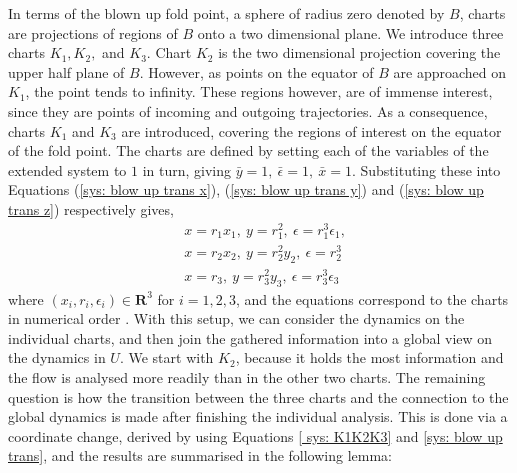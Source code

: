 In terms of the blown up fold point, a sphere of radius zero denoted by $B$, charts are projections of regions of $B$ onto a two dimensional plane. We introduce three charts $ K_1,K_2,$ and $K_3 $. Chart $K_2$ is the two dimensional projection covering the upper half plane of $B$. However, as points on the equator of $B$ are approached on $K_1$, the point tends to infinity. These regions however, are of immense interest, since they are points of incoming and outgoing trajectories. As a consequence, charts $K_1$ and $K_3$ are introduced, covering the regions of interest on the equator of the fold point. 
The charts are defined by setting each of the variables of the extended system to $1$ in turn, giving $ \bar{y}=1, \ \bar{\epsilon}=1, \ \bar{x}=1 $. Substituting these into Equations (\ref{sys: blow up trans x}), (\ref{sys: blow up trans y}) and (\ref{sys: blow up trans z}) respectively gives, 
\begin{subequations} \label{ sys: K1K2K3}
	\begin{align}
	&x=r_1x_1, \ y=r_1^2, \ \epsilon=r_1^3\epsilon_1, \label{sys: K1}\\
	&x=r_2x_2, \ y=r_2^2y_2, \ \epsilon=r_2^3 \label{sys: K2}\\
	&x=r_3, \ y=r_3^2y_3, \ \epsilon=r_3^3\epsilon_3\label{sys:K3}
	\end{align}
\end{subequations}
where $ (x_i,r_i,\epsilon_i)\in\mathbf{R}^3 $ for $ i=1,2,3 $, and the equations correspond to the charts in numerical order \citep{krupa2001}. 
With this setup, we can consider the dynamics on the individual charts, and then join the gathered information into a global view on the dynamics in $U$. We start with $K_2$,  because it holds the most information and the flow is analysed more readily than in the other two charts. The remaining question is how the transition between the three charts and the connection to the global dynamics is made after finishing the individual analysis. This is done via a coordinate change, derived by using Equations \ref{ sys: K1K2K3} and \ref{sys: blow up trans}, and the results are summarised in the following lemma:
